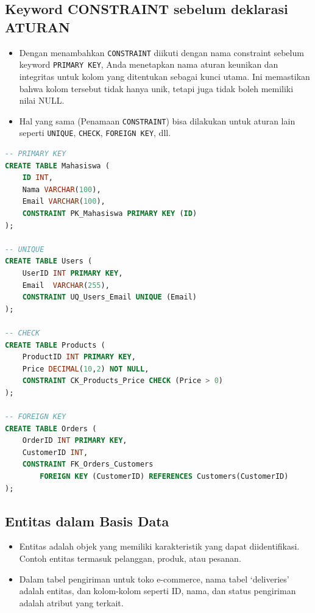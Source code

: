 \documentclass{article}
\begin{document}
\subsection{Keyword CONSTRAINT sebelum deklarasi ATURAN}
\begin{itemize}
    \item Dengan menambahkan \texttt{CONSTRAINT} diikuti dengan nama constraint sebelum keyword \texttt{PRIMARY KEY}, Anda menetapkan nama aturan keunikan dan integritas untuk kolom yang ditentukan sebagai kunci utama. Ini memastikan bahwa kolom tersebut tidak hanya unik, tetapi juga tidak boleh memiliki nilai NULL.\@
    \item Hal yang sama (Penamaan \texttt{CONSTRAINT}) bisa dilakukan untuk aturan lain seperti \texttt{UNIQUE}, \texttt{CHECK}, \texttt{FOREIGN KEY}, dll.
\end{itemize}
\begin{lstlisting}[language=SQL, caption={Sintaks Penamaan CONSTRAINT}, captionpos=b]
-- PRIMARY KEY
CREATE TABLE Mahasiswa (  
	ID INT,  
	Nama VARCHAR(100),  
	Email VARCHAR(100),  
	CONSTRAINT PK_Mahasiswa PRIMARY KEY (ID)  
);

-- UNIQUE
CREATE TABLE Users (
    UserID INT PRIMARY KEY,
    Email  VARCHAR(255),
    CONSTRAINT UQ_Users_Email UNIQUE (Email)
);

-- CHECK
CREATE TABLE Products (
    ProductID INT PRIMARY KEY,
    Price DECIMAL(10,2) NOT NULL,
    CONSTRAINT CK_Products_Price CHECK (Price > 0)
);

-- FOREIGN KEY
CREATE TABLE Orders (
    OrderID INT PRIMARY KEY,
    CustomerID INT,
    CONSTRAINT FK_Orders_Customers
        FOREIGN KEY (CustomerID) REFERENCES Customers(CustomerID)
);
\end{lstlisting}

\subsection{Entitas dalam Basis Data}
\begin{itemize}
    \item Entitas adalah objek yang memiliki karakteristik yang dapat diidentifikasi. Contoh entitas termasuk pelanggan, produk, atau pesanan.
    \item Dalam tabel pengiriman untuk toko e-commerce, nama tabel `deliveries' adalah entitas, dan kolom-kolom seperti ID, nama, dan status pengiriman adalah atribut yang terkait.
\end{itemize}
\end{document}
